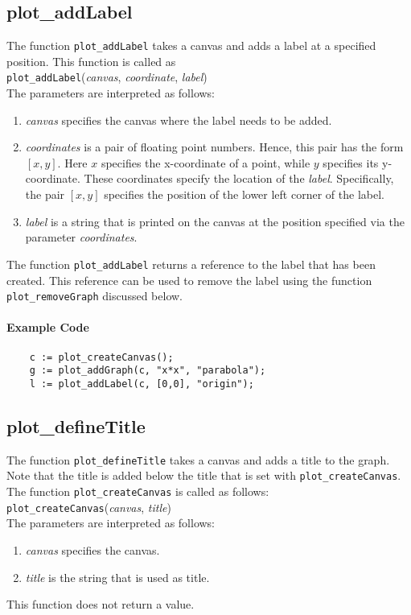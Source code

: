 \subsection{plot\_addLabel}
The function \texttt{plot\_addLabel} takes a canvas and adds a label at a specified position.  This
function is called as
\\[0.2cm]
\hspace*{1.3cm}
\texttt{plot\_addLabel}(\textsl{canvas}, \textsl{coordinate}, \textsl{label})
\\[0.2cm]
The parameters are interpreted as follows:
\begin{enumerate}
\item \textsl{canvas} specifies the canvas where the label needs to be added.
\item \textsl{coordinates} is a pair of floating point numbers.  Hence, this pair has
       the form $[x, y]$.  Here $x$ specifies the x-coordinate of a point, while 
       $y$ specifies its y-coordinate.  These coordinates specify the location of the
       \textsl{label}.  Specifically, the pair $[x,y]$ specifies the position of the lower left
       corner of the label. 
\item \textsl{label} is a string that is printed on the canvas at the position specified via the
      parameter \textsl{coordinates}. 
\end{enumerate}
The function \texttt{plot\_addLabel} returns a reference to the label that has been created.  This
reference can be used to remove the label using the function \texttt{plot\_removeGraph} discussed below.
\paragraph{Example Code}
\begin{verbatim}
    c := plot_createCanvas();
    g := plot_addGraph(c, "x*x", "parabola");
    l := plot_addLabel(c, [0,0], "origin");
\end{verbatim}

\subsection{plot\_defineTitle}
The function \texttt{plot\_defineTitle} takes a canvas and adds a title to the graph.  Note that the
title is added below the title that is set with \texttt{plot\_createCanvas}.  
The function \texttt{plot\_createCanvas} is called as follows:
\\[0.2cm]
\hspace*{1.3cm}
\texttt{plot\_createCanvas}(\textsl{canvas}, \textsl{title})
\\[0.2cm]
The parameters are interpreted as follows:
\begin{enumerate}
\item \textsl{canvas} specifies the canvas.
\item \textsl{title} is the string that is used as title.
\end{enumerate}
This function does not return a value. 

